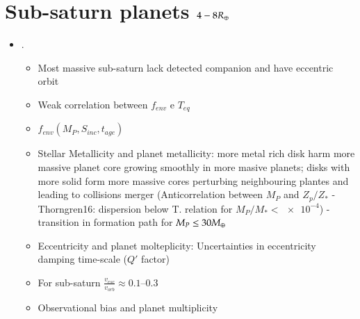 \documentclass[main.tex]{subfiles}
\begin{document}
\chapter{Sub-saturn planets $4-8R_{\oplus}{}$}
\begin{itemize}
    \item \cite{petigura2017four}.
    \begin{itemize}
        \item Most massive sub-saturn lack detected companion and have eccentric orbit
        \item Weak correlation between $f_{env}$ e $T_{eq}$
        \item $f_{env}(M_P,S_{inc},t_{age})$
        \item Stellar Metallicity and planet metallicity: more metal rich disk harm more massive planet core growing smoothly in more masive planets; disks with more solid form more massive cores perturbing neighbouring plantes and leading to collisions merger (Anticorrelation between $M_P$ and $Z_p/Z_*$ - Thorngren16: dispersion below T. relation for $M_P/M_*<\num{e-4}$) - transition in formation path for $M_P\leq30M_{\oplus}$
        \item Eccentricity and planet molteplicity: Uncertainties in eccentricity damping time-scale ($Q'$ factor)
        \item For sub-saturn $\frac{v_{esc}}{v_{orb}}\approx\numrange{0.1}{0.3}$
        \item Observational bias and planet multiplicity
    \end{itemize}
\end{itemize}
\end{document}
